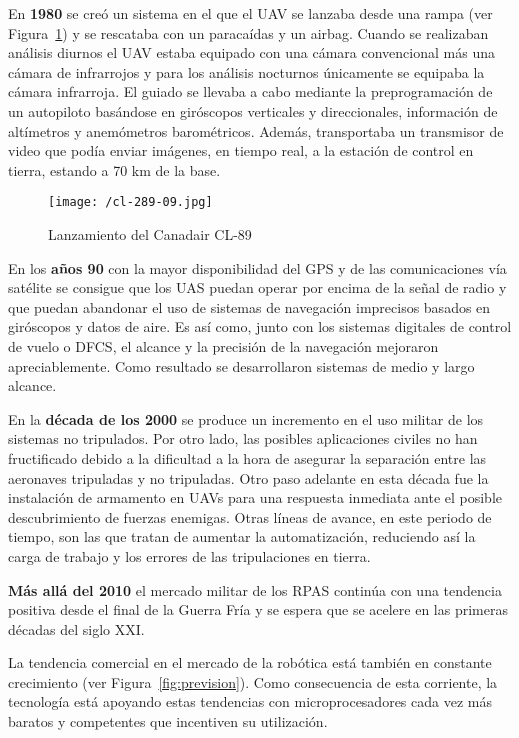 En \textbf{1980} se creó un sistema en el que el \acs{UAV} se lanzaba desde una rampa (ver Figura~\ref{fig:cl89}) y se rescataba con un paracaídas y un airbag. 
Cuando se realizaban análisis diurnos el \acs{UAV} estaba equipado con una cámara convencional más una cámara de infrarrojos y para los análisis nocturnos únicamente se equipaba la cámara infrarroja. El guiado se llevaba a cabo mediante la preprogramación de un autopiloto basándose en giróscopos verticales y direccionales, información de altímetros y anemómetros barométricos. 
Además, transportaba un transmisor de video que podía enviar imágenes, en tiempo real, a la estación de control 
en tierra, estando a 70 km de la base.

\begin{figure}[!h]
\begin{center}
\texttt{[image: /cl-289-09.jpg]}
\caption[Caption]{Lanzamiento del Canadair CL-89}
\label{fig:cl89}
\end{center}
\end{figure}

En los \textbf{años 90} con la mayor disponibilidad del \acs{GPS} y de las comunicaciones vía satélite se consigue que los \acs{UAS} puedan operar por encima de la señal de radio y que puedan abandonar el uso de sistemas de navegación imprecisos basados en giróscopos y
datos de aire. Es así como, junto con los sistemas digitales de control de vuelo o \acs{DFCS}, el alcance y la precisión de la navegación mejoraron apreciablemente. 
Como resultado se desarrollaron sistemas de medio y largo alcance. 

En la \textbf{década de los 2000} se produce un incremento en el uso militar de los sistemas no tripulados. 
Por otro lado, las posibles aplicaciones civiles no han fructificado debido a la dificultad a la hora de asegurar la 
separación entre las aeronaves tripuladas y no tripuladas.
Otro paso adelante en esta década fue la instalación de armamento en \acs{UAV}s para una respuesta inmediata ante el posible 
descubrimiento de fuerzas enemigas.
Otras líneas de avance, en este periodo de tiempo, son las que tratan de aumentar la automatización, reduciendo así
la carga de trabajo y los errores de las tripulaciones en tierra.

\textbf{Más allá del 2010} el mercado militar de los \acs{RPAS} continúa con una tendencia positiva desde el final de la Guerra Fría y se espera que se acelere en las primeras décadas del siglo XXI.

La tendencia comercial en el mercado de la robótica está también en constante crecimiento (ver Figura~\ref{fig:prevision}). Como consecuencia de esta corriente, la tecnología está apoyando estas tendencias con microprocesadores cada vez más baratos y competentes que incentiven su utilización.

